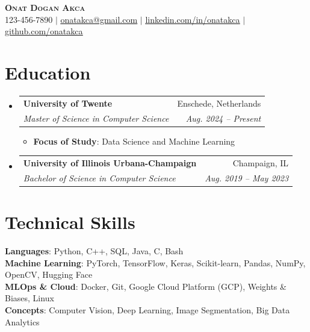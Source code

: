 \documentclass[letterpaper,11pt]{article}
\makeatletter
\newcommand{\resumeItem}[1]{
  \item\small{
    {#1 \vspace{-2pt}}
  }
}
\newcommand{\resumeSubheading}[4]{
  \vspace{-2pt}\item
    \begin{tabular*}{0.97\textwidth}[t]{l@{\extracolsep{\fill}}r}
      \textbf{#1} & #2 \\
      \textit{\small#3} & \textit{\small #4} \\
    \end{tabular*}\vspace{-7pt}
}
\newcommand{\resumeSubHeadingListStart}{\begin{itemize}[leftmargin=0.15in, label={}]}
\newcommand{\resumeSubHeadingListEnd}{\end{itemize}}
\newcommand{\resumeItemListStart}{\begin{itemize}}
\newcommand{\resumeItemListEnd}{\end{itemize}\vspace{-5pt}}
\makeatother
\begin{document}

\begin{center}
    \textbf{\Huge \scshape Onat Dogan Akca} \\ \vspace{1pt}
    \small 123-456-7890 $|$ \href{mailto:x@x.com}{\underline{onatakca@gmail.com}} $|$ 
    \href{https://linkedin.com/in/...}{\underline{linkedin.com/in/onatakca}} $|$
    \href{https://github.com/...}{\underline{github.com/onatakca}}
\end{center}


\section{Education}
  \resumeSubHeadingListStart
    \resumeSubheading
      {University of Twente}{Enschede, Netherlands}
      {Master of Science in Computer Science}{Aug. 2024 -- Present}
      \resumeItemListStart
        \resumeItem{\textbf{Focus of Study}: Data Science and Machine Learning}
      \resumeItemListEnd
    \resumeSubheading
      {University of Illinois Urbana-Champaign}{Champaign, IL}
      {Bachelor of Science in Computer Science}{Aug. 2019 -- May 2023}
  \resumeSubHeadingListEnd

\section{Technical Skills}
 \begin{itemize}[leftmargin=0.15in, label={}]
    \small{\item{
     \textbf{Languages}{: Python, C++, SQL, Java, C, Bash} \\
     \textbf{Machine Learning}{: PyTorch, TensorFlow, Keras, Scikit-learn, Pandas, NumPy, OpenCV, Hugging Face} \\
     \textbf{MLOps \& Cloud}{: Docker, Git, Google Cloud Platform (GCP), Weights \& Biases, Linux} \\
     \textbf{Concepts}{: Computer Vision, Deep Learning, Image Segmentation, Big Data Analytics}
    }}
 \end{itemize}
 
\end{document}

